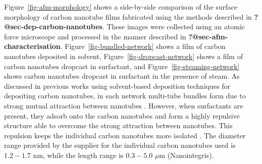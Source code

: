 \documentclass[
  a4paper,
]{scrbook}
\begin{document}
Figure~\ref{fig-afm-morphology} shows a side-by-side comparison of the
surface morphology of carbon nanotube films fabricated using the methods
described in \textbf{?@sec-dep-carbon-nanotubes}. These images were
collected using an atomic force microscope and processed in the manner
described in \textbf{?@sec-afm-characterisation}.
Figure~\ref{fig-bundled-network} shows a film of carbon nanotubes
deposited in solvent, Figure~\ref{fig-dropcast-network} shows a film of
carbon nanotubes dropcast in surfactant, and
Figure~\ref{fig-steaming-network} shows carbon nanotubes dropcast in
surfactant in the presence of steam. As discussed in previous works
using solvent-based deposition techniques for depositing carbon
nanotubes, in each network multi-tube bundles form due to strong mutual
attraction between nanotubes
\autocite{Zheng2017,Murugathas2018,Murugathas2019a,Nguyen2021}. However,
when surfactants are present, they adsorb onto the carbon nanotubes and
form a highly repulsive structure able to overcome the strong attraction
between nanotubes. This repulsion keeps the individual carbon nanotubes
more isolated
\autocite{Wenseleers2004,Gavrel2013,Hermanson2013-16,Shimizu2013,DiCrescenzo2014}.
The diameter range provided by the supplier for the individual carbon
nanotubes used is \(1.2-1.7\) nm, while the length range is \(0.3-5.0\)
\(\mu\)m (Nanointegris).
\end{document}
